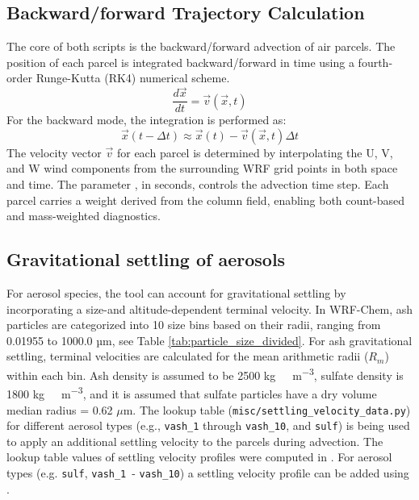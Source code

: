 \documentclass[11pt]{article}
\begin{document}
\subsection{Backward/forward Trajectory Calculation}
The core of both scripts is the backward/forward advection of air parcels. The position of each parcel is integrated backward/forward in time using a fourth-order Runge-Kutta (RK4) numerical scheme.
\begin{equation}
    \frac{d\vec{x}}{dt} = \vec{v}(\vec{x}, t)
\end{equation}
For the backward mode, the integration is performed as:
\begin{equation}
    \vec{x}(t - \Delta t) \approx \vec{x}(t) - \vec{v}(\vec{x}, t) \Delta t
\end{equation}
The velocity vector $\vec{v}$ for each parcel is determined by interpolating the U, V, and W wind components from the surrounding WRF grid points in both space and time. The parameter , in seconds, controls the advection time step. Each parcel carries a weight derived from the column field, enabling both count-based and mass-weighted diagnostics.

\subsection{Gravitational settling of aerosols}

For aerosol species, the tool can account for gravitational settling by incorporating a size-and altitude-dependent terminal velocity. In WRF-Chem, ash particles are categorized into 10 size bins based on their radii, ranging from 0.01955 to 1000.0 µm, see Table \ref{tab:particle_size_divided}. For ash gravitational settling, terminal velocities are calculated for the mean arithmetic radii ($R_{m}$) within each bin. Ash density is assumed to be 2500 \unit{kg\ m^{-3}}, sulfate density is 1800 \unit{kg\ m^{-3}}, and it is assumed that sulfate particles have a dry volume median radius = 0.62 $\mu$m. The lookup table (\texttt{misc/settling\_velocity\_data.py}) for different aerosol types (e.g., \texttt{vash\_1} through \texttt{vash\_10}, and \texttt{sulf}) is being used to apply an additional settling velocity to the parcels during advection. The lookup table values of settling velocity profiles were computed in \cite{ukhov2025enhancing}. For aerosol types (e.g. \texttt{sulf}, \texttt{vash\_1}\ - \texttt{vash\_{10}}) a settling velocity profile can be added using .
\end{document}
